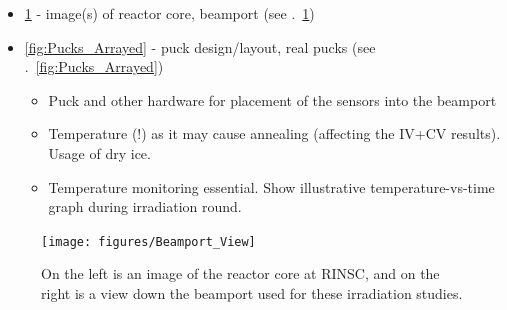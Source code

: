 \begin{itemize}
    \item \ref{fig:RINSC_Facility} - image(s) of reactor core, beamport (see .~\ref{fig:RINSC_Facility})
    \item \ref{fig:Pucks_Arrayed} - puck design/layout, real pucks (see .~\ref{fig:Pucks_Arrayed})
    \begin{itemize}
  \item Puck and other hardware for placement of the sensors into the beamport
  \item Temperature (!) as it may cause annealing (affecting the IV+CV results). Usage of dry ice.
  \item Temperature monitoring essential. Show illustrative temperature-vs-time graph during irradiation round. 
\end{itemize}
\end{itemize}

\begin{figure}[!hbt]
  \begin{center}
    \texttt{[image: figures/Beamport\_View]}
    \caption{On the left is an image of the reactor core at RINSC, and on the right is a view down the beamport used for these irradiation studies.}
    \label{fig:RINSC_Facility}
  \end{center}
\end{figure}

